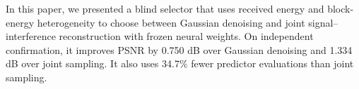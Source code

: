 In this paper, we presented a blind selector that uses received energy and block-energy heterogeneity to choose between Gaussian denoising and joint signal--interference reconstruction with frozen neural weights. On independent confirmation, it improves PSNR by 0.750 dB over Gaussian denoising and 1.334 dB over joint sampling. It also uses 34.7\% fewer predictor evaluations than joint sampling.

